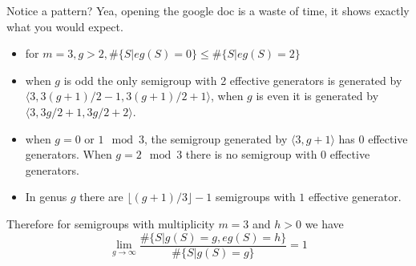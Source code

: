 Notice a pattern? Yea, opening the google doc is a waste of time, it shows exactly what you would expect. 
\newpage
\begin{itemize}
    \item for $m = 3, g > 2, \# \{S | eg(S) = 0\} \leq \# \{S | eg(S) = 2\}$  
    \item when $g$ is odd the only semigroup with 2 effective generators is generated by \\
    $\langle 3, 3(g+1)/2 - 1, 3(g+1)/2 +1  \rangle$, when $g$ is even it is generated by $\langle 3, 3g/2 + 1, 3g/2+2 \rangle $. 
    
    \item when $g = 0$ or $1 \mod 3$, the semigroup generated by $\langle 3, g+1 \rangle$ has 0 effective generators. When $g = 2 \mod 3$ there is no semigroup with 0 effective generators.
    
    \item In genus $g$ there are $\lfloor (g+1)/3\rfloor -1$ semigroups with $1$ effective generator. 
\end{itemize}

Therefore for semigroups with multiplicity $m=3$ and $h > 0$ we have 
$$\lim_{g \to \infty} \frac{\# \{S | g(S) = g, eg(S) = h \}}{\# \{ S | g(S) = g\}} = 1$$